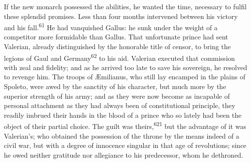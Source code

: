 



If the new monarch possessed the abilities, he wanted the time,
necessary to fulfil these splendid promises. Less than four
months intervened between his victory and his fall.\textsuperscript{61} He had
vanquished Gallus: he sunk under the weight of a competitor more
formidable than Gallus. That unfortunate prince had sent
Valerian, already distinguished by the honorable title of censor,
to bring the legions of Gaul and Germany\textsuperscript{62} to his aid. Valerian
executed that commission with zeal and fidelity; and as he
arrived too late to save his sovereign, he resolved to revenge
him. The troops of Æmilianus, who still lay encamped in the
plains of Spoleto, were awed by the sanctity of his character,
but much more by the superior strength of his army; and as they
were now become as incapable of personal attachment as they had
always been of constitutional principle, they readily imbrued
their hands in the blood of a prince who so lately had been the
object of their partial choice. The guilt was theirs,\textsuperscript{621} but the
advantage of it was Valerian’s; who obtained the possession of
the throne by the means indeed of a civil war, but with a degree
of innocence singular in that age of revolutions; since he owed
neither gratitude nor allegiance to his predecessor, whom he
dethroned.





